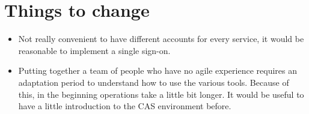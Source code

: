 \documentclass[a4paper,10pt]{report}
\begin{document}
\section{Things to change}
\begin{itemize}
	\item Not really convenient to have different accounts for every service, it would be reasonable to implement a single sign-on.
	\item Putting together a team of people who have no agile experience requires an adaptation period to understand how to use the various tools. Because of this, in the beginning operations take a little bit longer. It would be useful to have a little introduction to the CAS environment before.

\end{itemize}










\begin{abstract}
\end{abstract}
\end{document}
